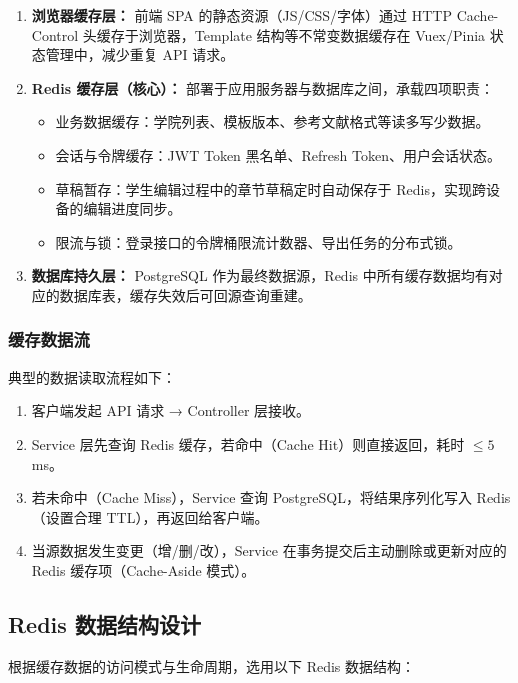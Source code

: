 \documentclass{../softeng}
\begin{document}
\begin{enumerate}
    \item \textbf{浏览器缓存层：} 前端 SPA 的静态资源（JS/CSS/字体）通过 HTTP Cache-Control 头缓存于浏览器，Template 结构等不常变数据缓存在 Vuex/Pinia 状态管理中，减少重复 API 请求。
    \item \textbf{Redis 缓存层（核心）：} 部署于应用服务器与数据库之间，承载四项职责：
    \begin{itemize}
        \item 业务数据缓存：学院列表、模板版本、参考文献格式等读多写少数据。
        \item 会话与令牌缓存：JWT Token 黑名单、Refresh Token、用户会话状态。
        \item 草稿暂存：学生编辑过程中的章节草稿定时自动保存于 Redis，实现跨设备的编辑进度同步。
        \item 限流与锁：登录接口的令牌桶限流计数器、导出任务的分布式锁。
    \end{itemize}
    \item \textbf{数据库持久层：} PostgreSQL 作为最终数据源，Redis 中所有缓存数据均有对应的数据库表，缓存失效后可回源查询重建。
\end{enumerate}

\subsubsection{缓存数据流}

典型的数据读取流程如下：

\begin{enumerate}
    \item 客户端发起 API 请求 → Controller 层接收。
    \item Service 层先查询 Redis 缓存，若命中（Cache Hit）则直接返回，耗时 $\le 5$ms。
    \item 若未命中（Cache Miss），Service 查询 PostgreSQL，将结果序列化写入 Redis（设置合理 TTL），再返回给客户端。
    \item 当源数据发生变更（增/删/改），Service 在事务提交后主动删除或更新对应的 Redis 缓存项（Cache-Aside 模式）。
\end{enumerate}

\subsection{Redis 数据结构设计}

根据缓存数据的访问模式与生命周期，选用以下 Redis 数据结构：
\end{document}
